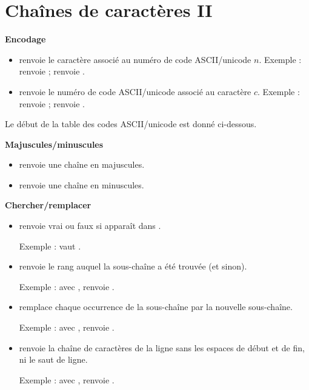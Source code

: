 \documentclass[11pt,class=report,crop=false]{standalone}
\begin{document}
\section{Chaînes de caractères II}



\textbf{Encodage}

\begin{itemize}
  \item {} \quad renvoie le caractère associé au numéro de code ASCII/unicode $n$. Exemple :  renvoie  ;  renvoie .
    
  \item {} \quad renvoie le numéro de code ASCII/unicode associé au caractère $c$. Exemple :  renvoie  ;  renvoie .
\end{itemize}

Le début de la table des codes ASCII/unicode est donné ci-dessous.


\bigskip

\textbf{Majuscules/minuscules}

\begin{itemize}
  \item {} renvoie une chaîne en majuscules.
  \item {} renvoie une chaîne en minuscules.  
\end{itemize}

\bigskip

\textbf{Chercher/remplacer}

\begin{itemize}
  \item {} \quad renvoie \og{}vrai\fg{} ou \og{}faux\fg{} si  apparaît dans .
  
   Exemple :
 vaut .

  \item  {} \quad renvoie le rang auquel  la sous-chaîne a été trouvée (et  sinon).
  
  Exemple : avec ,  renvoie  .
  
   \item  {} \quad remplace 
   chaque occurrence de la sous-chaîne par la nouvelle sous-chaîne.
   
   Exemple : avec ,  renvoie
   .
   
   \item {} renvoie la chaîne de caractères de la ligne sans les espaces de début et de fin, ni le saut de ligne. 
   
   Exemple : avec ,  renvoie
   .

\end{itemize}
\end{document}
